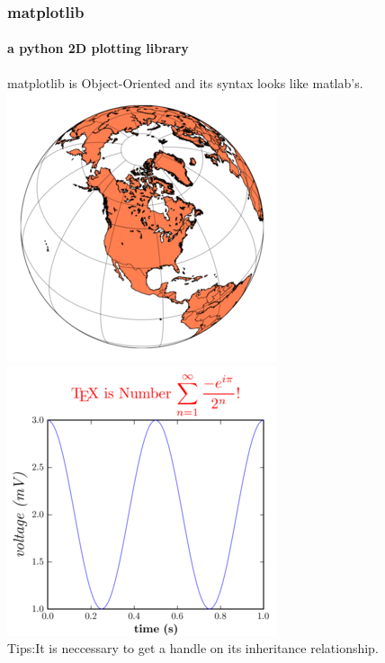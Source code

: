 \documentclass[compress=true]{beamer}
\begin{document}
\begin{frame}
	\frametitle{matplotlib}
	\framesubtitle {a python 2D plotting library}
	matplotlib is Object-Oriented and its syntax looks like matlab's.\\
	\includegraphics[height=0.5\textheight]{matplotlib_2.png}
	\includegraphics[height=0.5\textheight]{matplotlib_1.png}\\
	Tips:It is neccessary to get a handle on its inheritance relationship.
\end{frame}
\end{document}
